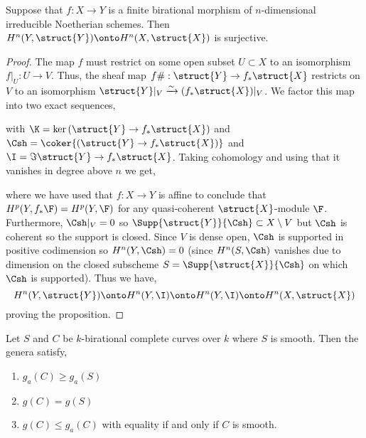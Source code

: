 \documentclass[12pt]{article}
\begin{document}
\begin{lemma}
Suppose that $f : X \to Y$ is a finite birational morphism of $n$-dimensional irreducible Noetherian schemes. Then $H^n(Y, \struct{Y}) \onto H^n(X, \struct{X})$ is surjective.
\end{lemma}

\begin{proof}
The map $f$ must restrict on some open subset $U \subset X$ to an isomorphism $f|_U : U \to V$. Thus, the sheaf map $f\# : \struct{Y} \to f_* \struct{X}$ restricts on $V$ to an isomorphism $\struct{Y}|_V \xrightarrow{\sim} (f_* \struct{X})|_V$. We factor this map into two exact sequences,
\begin{center}
\end{center}
with $\K = \ker{(\struct{Y} \to f_* \struct{X})}$ and $\Csh = \coker{(\struct{Y} \to f_* \struct{X})}$ and $\I = \Im{\struct{Y} \to f_* \struct{X}}$. Taking cohomology and using that it vanishes in degree above $n$ we get,
\begin{center}
\end{center}
where we have used that $f : X \to Y$ is affine to conclude that $H^p(Y, f_* \F) = H^p(Y, \F)$ for any quasi-coherent $\struct{X}$-module $\F$. Furthermore, $\Csh|_V = 0$ so $\Supp{\struct{Y}}{\Csh} \subset X \setminus V$ but $\Csh$ is coherent so the support is closed. Since $V$ is dense open, $\Csh$ is supported in positive codimension so $H^n(Y, \Csh) = 0$ (since $H^n(S, \Csh)$ vanishes due to dimension on the closed subscheme $S = \Supp{\struct{X}}{\Csh}$ on which $\Csh$ is supported). Thus we have,
\[ H^n(Y, \struct{Y}) \onto H^n(Y, \I) \onto H^n(Y, \I) \onto H^n(X, \struct{X}) \]
proving the proposition.
\end{proof}

\begin{cor}
Let $S$ and $C$ be $k$-birational complete curves over $k$ where $S$ is smooth. Then the genera satisfy,
\begin{enumerate}
\item $g_a(C) \ge g_a(S)$
\item $g(C) = g(S)$
\item $g(C) \le g_a(C)$ with equality if and only if $C$ is smooth.
\end{enumerate} 
\end{cor}
\end{document}
